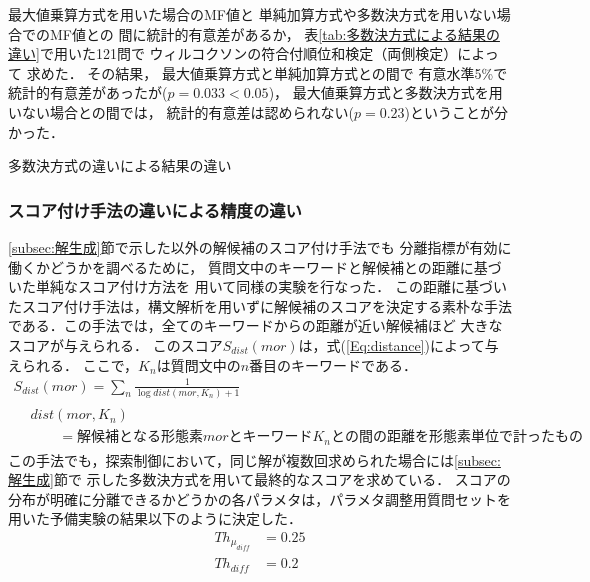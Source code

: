 \documentclass[japanese]{jnlp_1.4}
\begin{document}
最大値乗算方式を用いた場合のMF値と
単純加算方式や多数決方式を用いない場合でのMF値との
間に統計的有意差があるか，
表\ref{tab:多数決方式による結果の違い}で用いた121問で
ウィルコクソンの符合付順位和検定（両側検定）によって
求めた．
その結果，
最大値乗算方式と単純加算方式との間で
有意水準5\%で統計的有意差があったが($p=0.033<0.05$)，
最大値乗算方式と多数決方式を用いない場合との間では，
統計的有意差は認められない($p=0.23$)ということが分かった．

\begin{table}[t]
\caption{多数決方式の違いによる結果の違い}
\label{tab:多数決方式による結果の違い}
\begin{center}

\end{center}
\end{table}


\subsubsection{スコア付け手法の違いによる精度の違い}\label{subsec:他のスコア付け}

\ref{subsec:解生成}節で示した以外の解候補のスコア付け手法でも
分離指標が有効に働くかどうかを調べるために，
質問文中のキーワードと解候補との距離に基づいた単純なスコア付け方法を
用いて同様の実験を行なった．
この距離に基づいたスコア付け手法は，構文解析を用いずに解候補のスコアを決定する素朴な手法である．この手法では，全てのキーワードからの距離が近い解候補ほど
大きなスコアが与えられる．
このスコア$S_{dist}(mor)$は，式(\ref{Eq:distance})によって与えられる．
ここで，$K_n$は質問文中の$n$番目のキーワードである．
\begin{gather}
S_{dist}(mor)=\sum_n \frac{1}{\log dist(mor,K_n)+1}
\label{Eq:distance} \\
\begin{split}
{}&dist(mor,K_n) \\
 & \qquad = 解候補となる形態素morとキーワードK_nとの間の距離を形態素単位で計ったもの
\end{split} \nonumber
\end{gather}
この手法でも，探索制御において，同じ解が複数回求められた場合には\ref{subsec:解生成}節で
示した多数決方式を用いて最終的なスコアを求めている．
スコアの分布が明確に分離できるかどうかの各パラメタは，パラメタ調整用質問セットを用いた予備実験の結果以下のように決定した．
\begin{align}
Th_{\mu_{\mathit{diff}}} & = 0.25 \\
Th_{\mathit{diff}} & = 0.2
\end{align}
\end{document}
